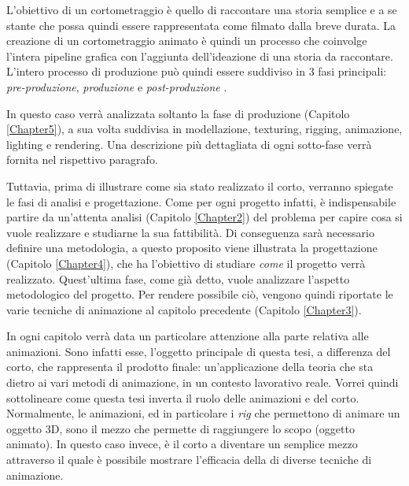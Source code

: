 L'obiettivo di un cortometraggio è quello di raccontare una storia semplice e a se stante che possa quindi essere rappresentata come filmato dalla breve durata.
La creazione di un cortometraggio animato è quindi un processo che coinvolge l'intera pipeline grafica con l'aggiunta dell'ideazione di una storia da raccontare. L'intero processo di produzione può quindi essere suddiviso in 3 fasi principali: \emph{pre-produzione}, \emph{produzione} e \emph{post-produzione} \parencite{roy2014finish}.
\newline

In questo caso verrà analizzata soltanto la fase di produzione (Capitolo \ref{Chapter5}), a sua volta suddivisa
in modellazione, texturing, rigging, animazione, lighting e rendering. Una descrizione più dettagliata di ogni
sotto-fase verrà fornita nel rispettivo paragrafo.

Tuttavia, prima di illustrare come sia stato realizzato il corto, verranno spiegate le fasi di analisi e
progettazione. Come per ogni progetto infatti, è indispensabile partire da un'attenta analisi (Capitolo \ref{Chapter2}) del problema per capire cosa si vuole realizzare e studiarne la sua fattibilità. Di conseguenza sarà necessario definire una metodologia, a questo proposito viene illustrata la progettazione (Capitolo \ref{Chapter4}), che ha l'obiettivo di studiare \emph{come} il progetto verrà realizzato.
Quest'ultima fase, come già detto, vuole analizzare l'aspetto metodologico del progetto. Per rendere possibile ciò, vengono quindi riportate le varie tecniche di animazione al capitolo precedente (Capitolo \ref{Chapter3}).

In ogni capitolo verrà data un particolare attenzione alla parte relativa alle animazioni. Sono infatti esse, l'oggetto principale di questa tesi, a differenza del corto, che rappresenta il prodotto finale: un'applicazione della teoria che sta dietro ai vari metodi di animazione, in un contesto lavorativo reale. Vorrei quindi sottolineare come questa tesi inverta il ruolo delle animazioni e del corto. Normalmente, le animazioni, ed in particolare i \emph{rig} che permettono di animare un oggetto 3D, sono il mezzo che permette di raggiungere lo scopo (oggetto animato). In questo caso invece, è il corto a diventare un semplice mezzo attraverso il quale è possibile mostrare l'efficacia della di diverse tecniche di animazione.



